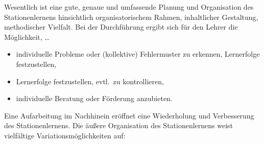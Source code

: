 \mip
Wesentlich ist eine gute, genaue und umfassende Planung und Organisation des Stationenlernens hinsichtlich
organisatorischem Rahmen, inhaltlicher Gestaltung, methodischer Vielfalt.
\mip
Bei der Durchf\"{u}hrung ergibt sich f\"{u}r den Lehrer die M\"{o}glichkeit, \dots
\begin{itemize}
\item individuelle Probleme oder (kollektive) Fehlermuster zu erkennen, Lernerfolge festzustellen,
\item Lernerfolge festzustellen, evtl.\ zu kontrollieren,
\item individuelle Beratung oder F\"{o}rderung anzubieten.
\end{itemize}
\mip
Eine Aufarbeitung im Nachhinein er\"{o}ffnet eine Wiederholung und Verbesserung des Stationenlernens.
\mip
Die \"{a}u{\ss}ere Organisation des Stationenlernens weist vielf\"{a}ltige Variationsm\"{o}glichkeiten auf:
